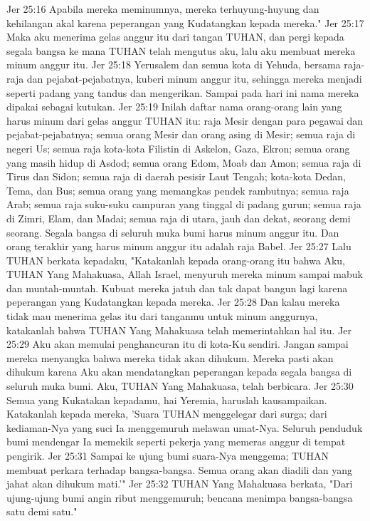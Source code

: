 Jer 25:16  Apabila mereka meminumnya, mereka terhuyung-huyung dan kehilangan akal karena peperangan yang Kudatangkan kepada mereka."
Jer 25:17  Maka aku menerima gelas anggur itu dari tangan TUHAN, dan pergi kepada segala bangsa ke mana TUHAN telah mengutus aku, lalu aku membuat mereka minum anggur itu.
Jer 25:18  Yerusalem dan semua kota di Yehuda, bersama raja-raja dan pejabat-pejabatnya, kuberi minum anggur itu, sehingga mereka menjadi seperti padang yang tandus dan mengerikan. Sampai pada hari ini nama mereka dipakai sebagai kutukan.
Jer 25:19  Inilah daftar nama orang-orang lain yang harus minum dari gelas anggur TUHAN itu: raja Mesir dengan para pegawai dan pejabat-pejabatnya; semua orang Mesir dan orang asing di Mesir; semua raja di negeri Us; semua raja kota-kota Filistin di Askelon, Gaza, Ekron; semua orang yang masih hidup di Asdod; semua orang Edom, Moab dan Amon; semua raja di Tirus dan Sidon; semua raja di daerah pesisir Laut Tengah; kota-kota Dedan, Tema, dan Bus; semua orang yang memangkas pendek rambutnya; semua raja Arab; semua raja suku-suku campuran yang tinggal di padang gurun; semua raja di Zimri, Elam, dan Madai; semua raja di utara, jauh dan dekat, seorang demi seorang. Segala bangsa di seluruh muka bumi harus minum anggur itu. Dan orang terakhir yang harus minum anggur itu adalah raja Babel.
Jer 25:27  Lalu TUHAN berkata kepadaku, "Katakanlah kepada orang-orang itu bahwa Aku, TUHAN Yang Mahakuasa, Allah Israel, menyuruh mereka minum sampai mabuk dan muntah-muntah. Kubuat mereka jatuh dan tak dapat bangun lagi karena peperangan yang Kudatangkan kepada mereka.
Jer 25:28  Dan kalau mereka tidak mau menerima gelas itu dari tanganmu untuk minum anggurnya, katakanlah bahwa TUHAN Yang Mahakuasa telah memerintahkan hal itu.
Jer 25:29  Aku akan memulai penghancuran itu di kota-Ku sendiri. Jangan sampai mereka menyangka bahwa mereka tidak akan dihukum. Mereka pasti akan dihukum karena Aku akan mendatangkan peperangan kepada segala bangsa di seluruh muka bumi. Aku, TUHAN Yang Mahakuasa, telah berbicara.
Jer 25:30  Semua yang Kukatakan kepadamu, hai Yeremia, haruslah kausampaikan. Katakanlah kepada mereka, 'Suara TUHAN menggelegar dari surga; dari kediaman-Nya yang suci Ia menggemuruh melawan umat-Nya. Seluruh penduduk bumi mendengar Ia memekik seperti pekerja yang memeras anggur di tempat pengirik.
Jer 25:31  Sampai ke ujung bumi suara-Nya menggema; TUHAN membuat perkara terhadap bangsa-bangsa. Semua orang akan diadili dan yang jahat akan dihukum mati.'"
Jer 25:32  TUHAN Yang Mahakuasa berkata, "Dari ujung-ujung bumi angin ribut menggemuruh; bencana menimpa bangsa-bangsa satu demi satu."
